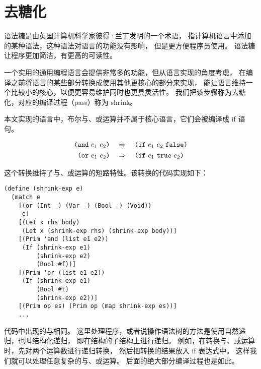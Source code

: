 \section{去糖化}

语法糖是由英国计算机科学家彼得·兰丁发明的一个术语，
指计算机语言中添加的某种语法，这种语法对语言的功能没有影响，
但是更方便程序员使用。
语法糖让程序更加简洁，有更高的可读性。

一个实用的通用编程语言会提供非常多的功能，但从语言实现的角度考虑，
在编译之前将语言的某些部分转换成使用其他更核心的部分来实现，
能让语言维持一个比较小的核心，以便更容易维护同时也更具灵活性。
我们把该步骤称为去糖化，对应的编译过程（pass）称为 shrink。

本文实现的语言中，布尔与、或运算并不属于核心语言，它们会被编译成 if 语句。
\begin{small}
\begin{align*}
  \texttt{(} \texttt{and}~e_1~e_2\texttt{)} & \quad \Rightarrow \quad \texttt{(}\texttt{if}~e_1~e_2~\texttt{false}{}\texttt{)}\\
  \texttt{(} \texttt{or}~e_1~e_2\texttt{)} & \quad \Rightarrow \quad \texttt{(}\texttt{if}~e_1~\texttt{true}{}~e_2\texttt{)}
\end{align*}
\end{small}

这个转换维持了与、或运算的短路特性。该转换的代码实现如下：

\begin{lstlisting}
(define (shrink-exp e)
  (match e
    [(or (Int _) (Var _) (Bool _) (Void))
     e]
    [(Let x rhs body)
     (Let x (shrink-exp rhs) (shrink-exp body))]
    [(Prim 'and (list e1 e2))
     (If (shrink-exp e1)
         (shrink-exp e2)
         (Bool #f))]
    [(Prim 'or (list e1 e2))
     (If (shrink-exp e1)
         (Bool #t)
         (shrink-exp e2))]
    [(Prim op es) (Prim op (map shrink-exp es))]
    ...
\end{lstlisting}

代码中出现的与相同。
这里处理程序，或者说操作语法树的方法是使用自然递归，也叫结构化递归，
即在结构的子结构上进行递归。
例如，在转换与、或运算时，先对两个运算数进行递归转换，
然后把转换的结果放入 if 表达式中。
这样我们就可以处理任意复杂的与、或运算。
后面的绝大部分编译过程也是如此。
